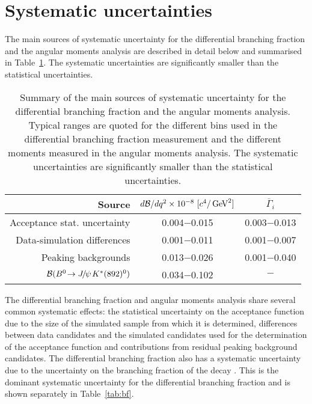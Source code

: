 \section{Systematic uncertainties}
\label{sec:kpimm:systematics}

The main sources of systematic uncertainty for the differential branching fraction and the angular moments analysis are described in detail below and summarised in Table~\ref{tab:systematics}. The systematic uncertainties are significantly smaller than the statistical uncertainties.

\begin{table}[!tb]
\caption{Summary of the main sources of systematic uncertainty for the differential branching fraction and the angular moments analysis. Typical ranges are quoted for the different \qsq bins used in the differential branching fraction measurement and the different moments measured in the angular moments analysis.  The systematic uncertainties are significantly smaller than the statistical uncertainties.}
\label{tab:systematics}
\begin{center}
\begin{tabular}{r|cc}
Source & $d{\mathcal{B}}/d{q^2} \times 10^{-8}~[c^{4}/\mathrm{\,Ge\kern -0.1em V}^{2}]$ & $\overline{\Gamma}_{i}$ \\
\hline
Acceptance stat. uncertainty & 0.004$-$0.015 & 0.003$-$0.013 \\
Data-simulation differences & 0.001$-$0.011 & 0.001$-$0.007 \\
Peaking backgrounds & 0.013$-$0.026 & 0.001$-$0.040 \\
\hline
${\mathcal{B}}({{B}^0}\!\rightarrow {\ensuremath{{J\mskip -3mu/\mskip -2mu\psi\mskip 2mu}}}{\ensuremath{K}}^{*}(892)^{0})$ & 0.034$-$0.102 & $-$ \\
\end{tabular}
\end{center}
\end{table} 

The differential branching fraction and angular moments analysis share several common systematic effects: the statistical uncertainty on the acceptance function due to the size of the simulated sample from which it is determined, differences between data candidates and the simulated candidates used for the determination of the acceptance function and contributions from residual peaking background candidates.  The differential branching fraction also has a systematic uncertainty due to the uncertainty on the branching fraction of the decay \BdToJPsiKstP. This is the dominant systematic uncertainty for the differential branching fraction and is shown separately in Table~\ref{tab:bf}. 

